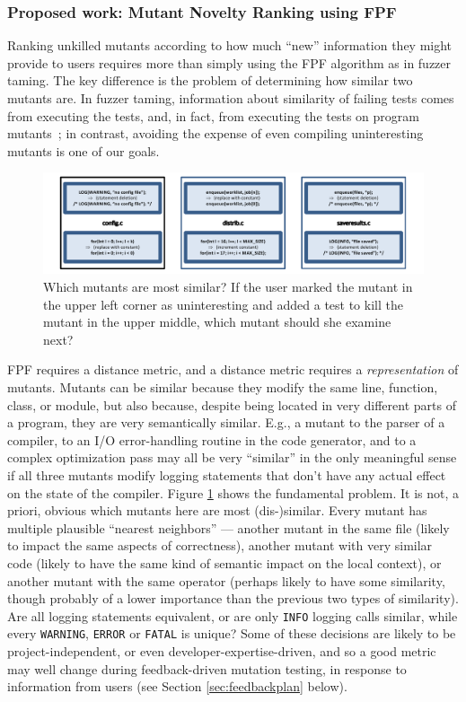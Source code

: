 \subsubsection{Proposed work: Mutant Novelty Ranking using FPF}

Ranking unkilled mutants according to how much ``new'' information they might
provide to users requires more than simply using the FPF algorithm as
in fuzzer taming.  The key difference is the problem of determining
how similar two mutants are.  In fuzzer taming, information about similarity of failing
tests comes from executing the tests, and, in fact, from executing the tests
on program mutants~\cite{PLDI13,distMut}; in contrast, avoiding the
expense of even compiling uninteresting mutants is one of our goals.

\begin{figure}[t]
\centering
\includegraphics[width=0.95\columnwidth]{distmetric}

\caption{Which mutants are most similar?  If the user marked the
  mutant in the upper left corner as uninteresting and added a test
  to kill the
  mutant in the upper middle, which mutant
  should she examine next?}
\label{fig:distances}
\end{figure}


FPF requires a distance metric, and a distance metric requires a
\emph{representation} of mutants.  Mutants can be similar because they
modify the same line, function, class, or module, but also because,
despite being located in very different parts of a program, they are
very semantically similar.  E.g., a mutant to the parser of a compiler, to
an I/O error-handling routine in the code generator, and to a complex
optimization pass may all be very ``similar'' in the only meaningful
sense if all three mutants modify logging statements that don't have
any actual effect on the state of the compiler.  Figure
\ref{fig:distances} shows the fundamental problem.  It is not,
a priori, obvious which mutants here are most (dis-)similar.  Every
mutant has multiple plausible ``nearest neighbors'' --- another mutant
in the same file (likely to impact the same aspects of correctness),
another mutant with very similar code (likely to have the same kind of
semantic impact on the local context), or another mutant with the same operator (perhaps
likely to have some similarity, though probably of a lower importance
than the previous two types of similarity).  Are all logging statements
equivalent, or are only {\tt INFO} logging calls similar, while every
{\tt WARNING}, {\tt ERROR} or {\tt FATAL} is unique?  Some of these
decisions are likely to be project-independent, or even
developer-expertise-driven, and so a good metric
may well change during feedback-driven mutation testing, in response
to information from users (see Section \ref{sec:feedbackplan} below).

